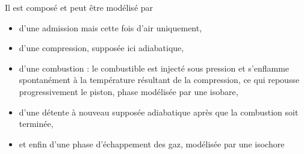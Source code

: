 \documentclass[12pt,prb,aps,epsf]{report}
\begin{document}
Il est composé et peut être modélisé par
\begin{itemize}
	\item d'une admission mais cette fois d'air uniquement,
	\item d'une compression, supposée ici adiabatique,
	\item d'une combustion : le combustible est injecté sous pression et s'enflamme spontanément à la température résultant de la compression, ce qui repousse progressivement le piston, phase modélisée par une isobare,
	\item d'une détente à nouveau supposée adiabatique après que la combustion soit terminée,
	\item et enfin d'une phase d'échappement des gaz, modélisée par une isochore
\end{itemize}
\end{document}
